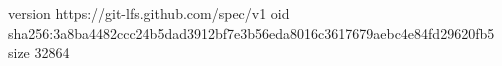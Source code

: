 version https://git-lfs.github.com/spec/v1
oid sha256:3a8ba4482ccc24b5dad3912bf7e3b56eda8016c3617679aebc4e84fd29620fb5
size 32864
